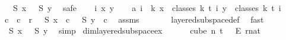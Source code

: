 \begin{isabellebody}
\ \ {\isasymchi}\ {\isacharparenleft}{\kern0pt}S\ x{\isacharparenright}{\kern0pt}\ {\isacharequal}{\kern0pt}\ {\isasymchi}\ {\isacharparenleft}{\kern0pt}S\ y{\isacharparenright}{\kern0pt}{\isachardoublequoteclose}\ \isanewline
%
\isadelimproof
%
\endisadelimproof
%
\isatagproof
{}\isamarkupfalse%
\ {\isacharparenleft}{\kern0pt}safe{\isacharparenright}{\kern0pt}\isanewline
\ \ \isamarkupfalse%
\ i\ x\ y\isanewline
\ \ \isamarkupfalse%
\ a{\isacharcolon}{\kern0pt}\ {\isachardoublequoteopen}i\ {\isasymle}\ k{\isachardoublequoteclose}\ {\isachardoublequoteopen}x\ {\isasymin}\ classes\ k\ t\ i{\isachardoublequoteclose}\ {\isachardoublequoteopen}y\ {\isasymin}\ classes\ k\ t\ i{\isachardoublequoteclose}\isanewline
\ \ \isamarkupfalse%
\ \isamarkupfalse%
\ c\ \ {\isachardoublequoteopen}c\ {\isacharless}{\kern0pt}\ r\ {\isasymand}\ {\isasymchi}\ {\isacharparenleft}{\kern0pt}S\ x{\isacharparenright}{\kern0pt}\ {\isacharequal}{\kern0pt}\ c\ {\isasymand}\ {\isasymchi}\ {\isacharparenleft}{\kern0pt}S\ y{\isacharparenright}{\kern0pt}\ {\isacharequal}{\kern0pt}\ c{\isachardoublequoteclose}\ \isamarkupfalse%
\ assms\ \isamarkupfalse%
\isanewline
\ \ \ \ \ \ layered{\isacharunderscore}{\kern0pt}subspace{\isacharunderscore}{\kern0pt}def\ \isamarkupfalse%
\ fast\isanewline
\ \ \isamarkupfalse%
\ \isamarkupfalse%
\ {\isachardoublequoteopen}{\isasymchi}\ {\isacharparenleft}{\kern0pt}S\ x{\isacharparenright}{\kern0pt}\ {\isacharequal}{\kern0pt}\ {\isasymchi}\ {\isacharparenleft}{\kern0pt}S\ y{\isacharparenright}{\kern0pt}{\isachardoublequoteclose}\ \isamarkupfalse%
\ simp\isanewline
{}\isamarkupfalse%
%
\endisatagproof
{\isafoldproof}%
%
\isadelimproof
\isanewline
%
\endisadelimproof
\isanewline
{}\isamarkupfalse%
\ dim{}{\isacharunderscore}{\kern0pt}layered{\isacharunderscore}{\kern0pt}subspace{\isacharunderscore}{\kern0pt}ex{\isacharcolon}{\kern0pt}\ \isanewline
\ \ \ {\isachardoublequoteopen}{\isasymchi}\ {\isasymin}\ {\isacharparenleft}{\kern0pt}cube\ n\ {\isacharparenleft}{\kern0pt}t\ {\isacharplus}{\kern0pt}\ {}{\isacharparenright}{\kern0pt}{\isacharparenright}{\kern0pt}\ {\isasymrightarrow}\isactrlsub E\ {\isacharbraceleft}{\kern0pt}{\isachardot}{\kern0pt}{\isachardot}{\kern0pt}{\isacharless}{\kern0pt}r{\isacharcolon}{\kern0pt}{\isacharcolon}{\kern0pt}nat{\isacharbraceright}{\kern0pt}{\isachardoublequoteclose}\ \isanewline

\end{isabellebody}
